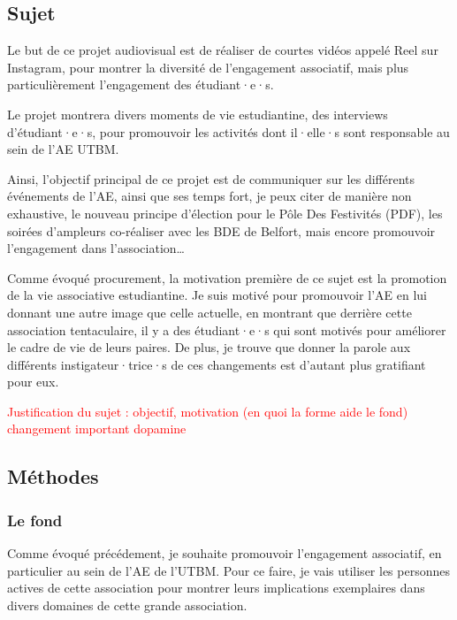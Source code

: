
\subsection{Sujet}\label{subsec:sujet}

Le but de ce projet audiovisual est de réaliser de courtes vidéos appelé Reel sur Instagram, pour montrer la diversité de l'engagement associatif, mais plus particulièrement l'engagement des étudiant·e·s.

Le projet montrera divers moments de vie estudiantine, des interviews d'étudiant·e·s, pour promouvoir les activités dont il·elle·s sont responsable au sein de l'AE UTBM.

Ainsi, l'objectif principal de ce projet est de communiquer sur les différents événements de l'AE, ainsi que ses temps fort, je peux citer de manière non exhaustive, le nouveau principe d'élection pour le Pôle Des Festivités (PDF), les soirées d'ampleurs co-réaliser avec les BDE de Belfort, mais encore promouvoir l'engagement dans l'association\ldots

Comme évoqué procurement, la motivation première de ce sujet est la promotion de la vie associative estudiantine.
Je suis motivé pour promouvoir l'AE en lui donnant une autre image que celle actuelle, en montrant que derrière cette association tentaculaire, il y a des étudiant·e·s qui sont motivés pour améliorer le cadre de vie de leurs paires.
De plus, je trouve que donner la parole aux différents instigateur·trice·s de ces changements est d'autant plus gratifiant pour eux.

\textcolor{red}{Justification du sujet : objectif, motivation (en quoi la forme aide le fond) changement important dopamine}


\subsection{Méthodes}\label{subsec:methodes}


\subsubsection{Le fond}

Comme évoqué précédement, je souhaite promouvoir l'engagement associatif, en particulier au sein de l'AE de l'UTBM.
Pour ce faire, je vais utiliser les personnes actives de cette association pour montrer leurs implications exemplaires dans divers domaines de cette grande association.

